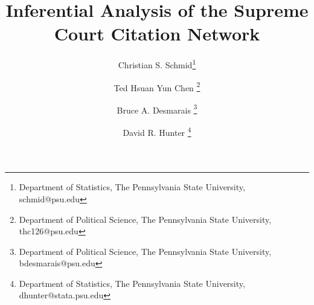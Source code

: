 \documentclass[headsepline=true, abstracton]{scrartcl}
\begin{document}
\renewcommand{\refname}{Bibliography}


\onehalfspacing
\setlength{\headsep}{15mm}


\thispagestyle{plain}

\title{\Large Inferential Analysis of the Supreme Court Citation Network}

\author{%
  Christian S. Schmid\footnote{Department of Statistics, The Pennsylvania State University, schmid@psu.edu}%
  \and Ted Hsuan Yun Chen \footnote{Department of Political Science, The Pennsylvania State University, thc126@psu.edu}%
  \and Bruce A. Desmarais \footnote{Department of Political Science, The Pennsylvania State University, bdesmarais@psu.edu}%
  \and David R. Hunter \footnote{Department of Statistics, The Pennsylvania State University, dhunter@stata.psu.edu}%
  }
\end{document}
